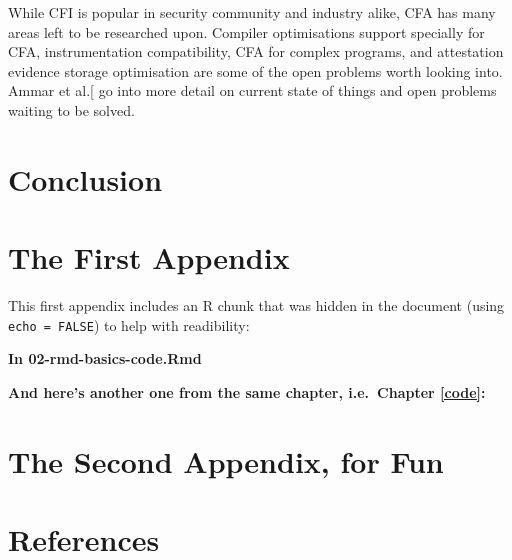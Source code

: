 \documentclass[a4paper, nobind]{templates/ociamthesis}
\begin{document}
While CFI is popular in security community and industry alike, CFA has many areas
left to be researched upon. Compiler optimisations support specially for CFA,
instrumentation compatibility, CFA for complex programs, and attestation evidence
storage optimisation are some of the open problems worth looking into.
Ammar et al.{[}\citeproc{ref-sok}{5}{]} go into more detail on current state of things and open problems
waiting to be solved.

\chapter*{Conclusion}\label{conclusion}

\startappendices

\chapter{The First Appendix}\label{the-first-appendix}

This first appendix includes an R chunk that was hidden in the document (using \texttt{echo\ =\ FALSE}) to help with readibility:

\textbf{In 02-rmd-basics-code.Rmd}

\textbf{And here's another one from the same chapter, i.e.~Chapter \ref{code}:}

\chapter{The Second Appendix, for Fun}\label{the-second-appendix-for-fun}

\chapter*{References}\label{references}

\end{document}
